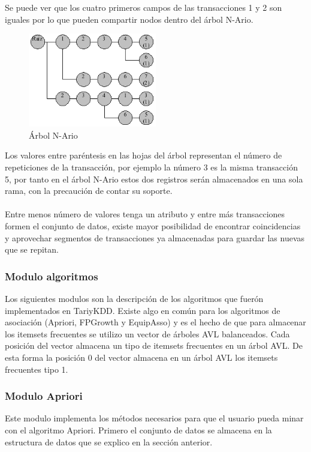 Se puede ver que los cuatro primeros campos de las transacciones 1 y 2 son iguales por lo que pueden compartir
nodos dentro del \'arbol N-Ario. 

\begin{figure}[ht]
\centering
\includegraphics[width=0.5\textwidth]{images/nario2.png}
\caption{\'Arbol N-Ario}
\end{figure}

Los valores entre par\'entesis en las hojas del \'arbol representan el número de repeticiones de la
transacci\'on, por ejemplo la n\'umero 3 es la misma transacci\'on 5, por tanto en el \'arbol N-Ario estos dos
registros ser\'an almacenados en una sola rama, con la precauci\'on de contar su soporte.\\
\\
Entre menos n\'umero de valores tenga un atributo y entre m\'as transacciones formen el conjunto de datos, existe
mayor posibilidad de encontrar coincidencias y aprovechar segmentos de transacciones ya almacenadas para guardar
las nuevas que se repitan.\\

\subsubsection{Modulo algoritmos}
Los siguientes modulos son la descripci\'on de los algoritmos que fuer\'on implementados en TariyKDD. Existe algo
en com\'un para los algoritmos de asociaci\'on (Apriori, FPGrowth y EquipAsso) y es el hecho de que para almacenar
los itemsets frecuentes se utilizo un vector de \'arboles AVL balanceados. Cada posici\'on del vector almacena un
tipo de itemsets frecuentes en un \'arbol AVL. De esta forma la posici\'on 0 del vector almacena en un \'arbol AVL
los itemsets frecuentes tipo 1.

\subsubsection{Modulo Apriori}
Este modulo implementa los m\'etodos necesarios para que el usuario pueda minar con el algoritmo Apriori. Primero
el conjunto de datos se almacena en la estructura de datos que se explico en la secci\'on anterior. 

